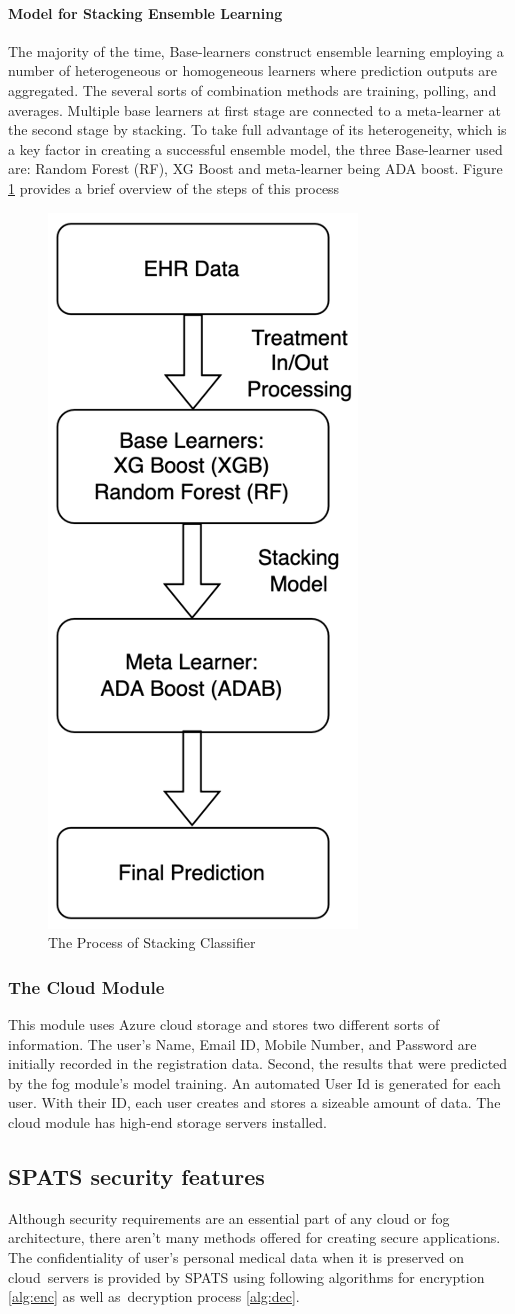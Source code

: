 \documentclass[10pt]{article}
\begin{document}
\paragraph{Model for Stacking Ensemble Learning}
The majority of the time, Base-learners construct ensemble learning employing a number of heterogeneous or homogeneous learners where prediction outputs are aggregated. The several sorts of combination methods are training, polling, and averages. Multiple base learners at first stage are connected to a meta-learner at the second stage by stacking.
To take full advantage of its heterogeneity, which is a key factor in creating a successful ensemble model, the three Base-learner used are: Random Forest (RF), XG Boost and meta-learner being ADA boost. Figure \ref{fig:5} provides a brief overview of the steps of this process
\begin{figure}[H]
    \begin{center}
        \includegraphics[width=0.18\linewidth,frame]{CA2-template/RIC4.png}
        \caption{The Process of Stacking Classifier\label{fig:5}}
    \end{center}
\end{figure}

\subsubsection{The Cloud Module}
This module uses Azure cloud storage and stores two different sorts of information. The user's Name, Email ID, Mobile Number, and Password are initially recorded in the registration data. Second, the results that were predicted by the fog module's model training. An automated User Id is generated for each user. With their ID, each user creates and stores a sizeable amount of data. The cloud module has high-end storage servers installed. 
\subsection{SPATS security features}
Although security requirements are an essential part of any cloud or fog architecture, there aren't many methods offered for creating secure applications. The confidentiality of user's personal medical data when it is preserved on cloud servers is provided by SPATS using following algorithms for encryption \ref{alg:enc} as well as decryption process \ref{alg:dec}. 
\end{document}
